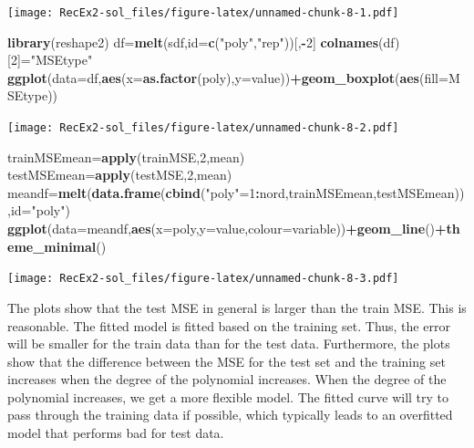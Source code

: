 \documentclass[]{article}
\newenvironment{Shaded}{\begin{snugshade}}{\end{snugshade}}
\newcommand{\KeywordTok}[1]{\textcolor[rgb]{0.13,0.29,0.53}{\textbf{#1}}}
\newcommand{\DataTypeTok}[1]{\textcolor[rgb]{0.13,0.29,0.53}{#1}}
\newcommand{\DecValTok}[1]{\textcolor[rgb]{0.00,0.00,0.81}{#1}}
\newcommand{\StringTok}[1]{\textcolor[rgb]{0.31,0.60,0.02}{#1}}
\newcommand{\OperatorTok}[1]{\textcolor[rgb]{0.81,0.36,0.00}{\textbf{#1}}}
\newcommand{\NormalTok}[1]{#1}
\begin{document}
\texttt{[image: RecEx2-sol\_files/figure-latex/unnamed-chunk-8-1.pdf]}

\begin{Shaded}
\begin{Highlighting}[]
\KeywordTok{library}\NormalTok{(reshape2)}
\NormalTok{df=}\KeywordTok{melt}\NormalTok{(sdf,}\DataTypeTok{id=}\KeywordTok{c}\NormalTok{(}\StringTok{"poly"}\NormalTok{,}\StringTok{"rep"}\NormalTok{))[,}\OperatorTok{-}\DecValTok{2}\NormalTok{]}
\KeywordTok{colnames}\NormalTok{(df)[}\DecValTok{2}\NormalTok{]=}\StringTok{"MSEtype"}
\KeywordTok{ggplot}\NormalTok{(}\DataTypeTok{data=}\NormalTok{df,}\KeywordTok{aes}\NormalTok{(}\DataTypeTok{x=}\KeywordTok{as.factor}\NormalTok{(poly),}\DataTypeTok{y=}\NormalTok{value))}\OperatorTok{+}\KeywordTok{geom_boxplot}\NormalTok{(}\KeywordTok{aes}\NormalTok{(}\DataTypeTok{fill=}\NormalTok{MSEtype))}
\end{Highlighting}
\end{Shaded}

\texttt{[image: RecEx2-sol\_files/figure-latex/unnamed-chunk-8-2.pdf]}

\begin{Shaded}
\begin{Highlighting}[]
\NormalTok{trainMSEmean=}\KeywordTok{apply}\NormalTok{(trainMSE,}\DecValTok{2}\NormalTok{,mean)}
\NormalTok{testMSEmean=}\KeywordTok{apply}\NormalTok{(testMSE,}\DecValTok{2}\NormalTok{,mean)}
\NormalTok{meandf=}\KeywordTok{melt}\NormalTok{(}\KeywordTok{data.frame}\NormalTok{(}\KeywordTok{cbind}\NormalTok{(}\StringTok{"poly"}\NormalTok{=}\DecValTok{1}\OperatorTok{:}\NormalTok{nord,trainMSEmean,testMSEmean)),}\DataTypeTok{id=}\StringTok{"poly"}\NormalTok{)}
\KeywordTok{ggplot}\NormalTok{(}\DataTypeTok{data=}\NormalTok{meandf,}\KeywordTok{aes}\NormalTok{(}\DataTypeTok{x=}\NormalTok{poly,}\DataTypeTok{y=}\NormalTok{value,}\DataTypeTok{colour=}\NormalTok{variable))}\OperatorTok{+}\KeywordTok{geom_line}\NormalTok{()}\OperatorTok{+}\KeywordTok{theme_minimal}\NormalTok{()}
\end{Highlighting}
\end{Shaded}

\texttt{[image: RecEx2-sol\_files/figure-latex/unnamed-chunk-8-3.pdf]}

The plots show that the test MSE in general is larger than the train
MSE. This is reasonable. The fitted model is fitted based on the
training set. Thus, the error will be smaller for the train data than
for the test data. Furthermore, the plots show that the difference
between the MSE for the test set and the training set increases when the
degree of the polynomial increases. When the degree of the polynomial
increases, we get a more flexible model. The fitted curve will try to
pass through the training data if possible, which typically leads to an
overfitted model that performs bad for test data.
\end{document}
